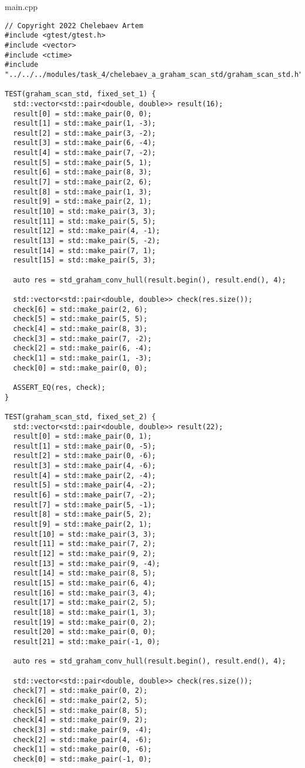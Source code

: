 \documentclass{report}
\begin{document}
main.cpp
\begin{lstlisting}
// Copyright 2022 Chelebaev Artem
#include <gtest/gtest.h>
#include <vector>
#include <ctime>
#include "../../../modules/task_4/chelebaev_a_graham_scan_std/graham_scan_std.h"

TEST(graham_scan_std, fixed_set_1) {
  std::vector<std::pair<double, double>> result(16);
  result[0] = std::make_pair(0, 0);
  result[1] = std::make_pair(1, -3);
  result[2] = std::make_pair(3, -2);
  result[3] = std::make_pair(6, -4);
  result[4] = std::make_pair(7, -2);
  result[5] = std::make_pair(5, 1);
  result[6] = std::make_pair(8, 3);
  result[7] = std::make_pair(2, 6);
  result[8] = std::make_pair(1, 3);
  result[9] = std::make_pair(2, 1);
  result[10] = std::make_pair(3, 3);
  result[11] = std::make_pair(5, 5);
  result[12] = std::make_pair(4, -1);
  result[13] = std::make_pair(5, -2);
  result[14] = std::make_pair(7, 1);
  result[15] = std::make_pair(5, 3);

  auto res = std_graham_conv_hull(result.begin(), result.end(), 4);

  std::vector<std::pair<double, double>> check(res.size());
  check[6] = std::make_pair(2, 6);
  check[5] = std::make_pair(5, 5);
  check[4] = std::make_pair(8, 3);
  check[3] = std::make_pair(7, -2);
  check[2] = std::make_pair(6, -4);
  check[1] = std::make_pair(1, -3);
  check[0] = std::make_pair(0, 0);

  ASSERT_EQ(res, check);
}

TEST(graham_scan_std, fixed_set_2) {
  std::vector<std::pair<double, double>> result(22);
  result[0] = std::make_pair(0, 1);
  result[1] = std::make_pair(0, -5);
  result[2] = std::make_pair(0, -6);
  result[3] = std::make_pair(4, -6);
  result[4] = std::make_pair(2, -4);
  result[5] = std::make_pair(4, -2);
  result[6] = std::make_pair(7, -2);
  result[7] = std::make_pair(5, -1);
  result[8] = std::make_pair(5, 2);
  result[9] = std::make_pair(2, 1);
  result[10] = std::make_pair(3, 3);
  result[11] = std::make_pair(7, 2);
  result[12] = std::make_pair(9, 2);
  result[13] = std::make_pair(9, -4);
  result[14] = std::make_pair(8, 5);
  result[15] = std::make_pair(6, 4);
  result[16] = std::make_pair(3, 4);
  result[17] = std::make_pair(2, 5);
  result[18] = std::make_pair(1, 3);
  result[19] = std::make_pair(0, 2);
  result[20] = std::make_pair(0, 0);
  result[21] = std::make_pair(-1, 0);

  auto res = std_graham_conv_hull(result.begin(), result.end(), 4);

  std::vector<std::pair<double, double>> check(res.size());
  check[7] = std::make_pair(0, 2);
  check[6] = std::make_pair(2, 5);
  check[5] = std::make_pair(8, 5);
  check[4] = std::make_pair(9, 2);
  check[3] = std::make_pair(9, -4);
  check[2] = std::make_pair(4, -6);
  check[1] = std::make_pair(0, -6);
  check[0] = std::make_pair(-1, 0);


\end{lstlisting}
\end{document}
